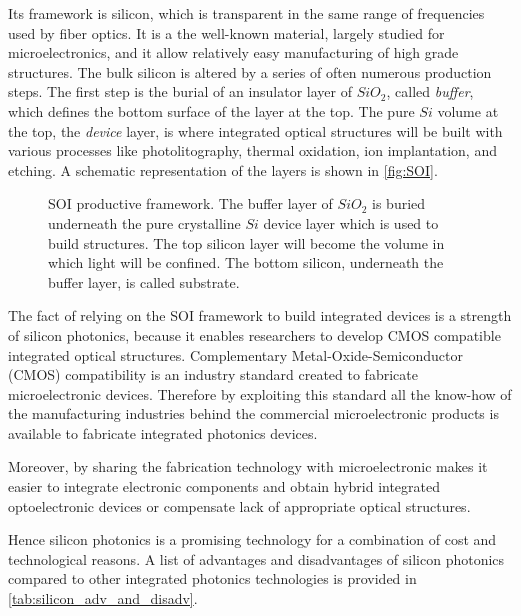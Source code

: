 Its framework is silicon, which is transparent in the same range of frequencies used by fiber optics.
It is a the well-known material, largely studied for microelectronics, and it allow relatively easy manufacturing of high grade structures.
The bulk silicon is altered by a series of often numerous production steps.
The first step is the burial of an insulator layer of $SiO_2$, called \textit{buffer}, which defines the bottom surface of the layer at the top.
The pure $Si$ volume at the top, the \textit{device} layer, is where integrated optical structures will be built with various processes like photolitography, thermal oxidation, ion implantation, and etching.
A schematic representation of the layers is shown in \autoref{fig:SOI}.

\begin{figure}[ht]
	\centering
	
	\caption{SOI productive framework.
		The buffer layer of $SiO_2$ is buried underneath the pure crystalline $Si$ device layer which is used to build structures.
		The top silicon layer will become the volume in which light will be confined.
		The bottom silicon, underneath the buffer layer, is called substrate.
		}
	\label{fig:SOI}
\end{figure}

The fact of relying on the SOI framework to build integrated devices is a strength of silicon photonics, because it enables researchers to develop CMOS compatible integrated optical structures.
Complementary Metal-Oxide-Semiconductor (CMOS) compatibility is an industry standard created to fabricate microelectronic devices.
Therefore by exploiting this standard all the know-how of the manufacturing industries behind the commercial microelectronic products is available to fabricate integrated photonics devices.

Moreover, by sharing the fabrication technology with microelectronic makes it easier to integrate electronic components and obtain hybrid integrated optoelectronic devices or compensate lack of appropriate optical structures.

Hence silicon photonics is a promising technology for a combination of cost and technological reasons.
A list of advantages and disadvantages of silicon photonics compared to other integrated photonics technologies is provided in \autoref{tab:silicon_adv_and_disadv}.

